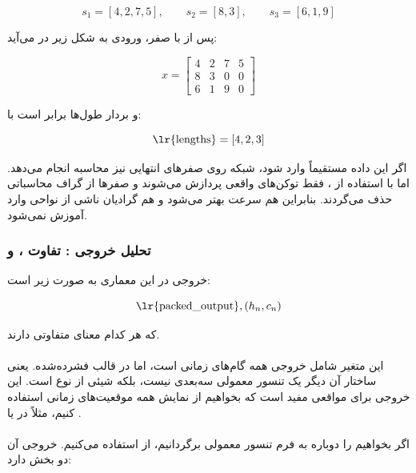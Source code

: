 \documentclass{article}
\begin{document}
\begin{equation}
	s_1 = [4,2,7,5], \qquad s_2 = [8,3], \qquad s_3 = [6,1,9]
\end{equation}

پس از  با صفر، ورودی به شکل زیر در می‌آید:

\begin{equation}
	x =
	\begin{bmatrix}
		4 & 2 & 7 & 5 \\
		8 & 3 & 0 & 0 \\
		6 & 1 & 9 & 0
	\end{bmatrix}
\end{equation}

و بردار طول‌ها برابر است با:

\begin{equation}
	\text{\lr{lengths}} = [4,2,3]
\end{equation}

اگر این داده مستقیماً وارد  شود، شبکه روی صفرهای انتهایی نیز محاسبه انجام می‌دهد. اما با استفاده از ، فقط توکن‌های واقعی پردازش می‌شوند و صفرها از گراف محاسباتی حذف می‌گردند. بنابراین هم سرعت بهتر می‌شود و هم گرادیان ناشی از نواحی  وارد آموزش نمی‌شود.

\subsubsection{تحلیل خروجی : تفاوت ،  و }

خروجی  در این معماری به صورت زیر است:

\begin{equation}
	\text{\lr{packed\_output}}, (h_n, c_n)
\end{equation}

که هر کدام معنای متفاوتی دارند.

\paragraph{}
این متغیر شامل خروجی همه گام‌های زمانی است، اما در قالب فشرده‌شده. یعنی ساختار آن دیگر یک تنسور معمولی سه‌بعدی نیست، بلکه شیئی از نوع  است. این خروجی برای مواقعی مفید است که بخواهیم از نمایش همه موقعیت‌های زمانی استفاده کنیم، مثلاً در  یا .

\paragraph{}
اگر بخواهیم  را دوباره به فرم تنسور معمولی برگردانیم، از  استفاده می‌کنیم. خروجی آن دو بخش دارد:
\end{document}
